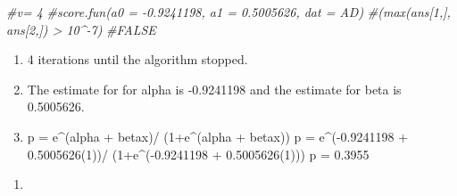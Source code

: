 \documentclass[
]{article}
\newenvironment{Shaded}{\begin{snugshade}}{\end{snugshade}}
\newcommand{\CommentTok}[1]{\textcolor[rgb]{0.56,0.35,0.01}{\textit{#1}}}
\providecommand{\tightlist}{%
  \setlength{\itemsep}{0pt}\setlength{\parskip}{0pt}}
\begin{document}
\begin{Shaded}
\begin{Highlighting}[]
\CommentTok{\#v= 4}
\CommentTok{\#score.fun(a0 = {-}0.9241198, a1 = 0.5005626, dat = AD)}
\CommentTok{\#(max(ans[1,], ans[2,]) \textgreater{} 10\^{}{-}7)}
\CommentTok{\#FALSE}
\end{Highlighting}
\end{Shaded}

\begin{enumerate}
\def\labelenumi{(\roman{enumi})}
\setcounter{enumi}{1}
\item
  4 iterations until the algorithm stopped.
\item
  The estimate for for alpha is -0.9241198 and the estimate for beta is
  0.5005626.
\item
  p = e\^{}(alpha + betax)/ (1+e\^{}(alpha + betax)) p =
  e\^{}(-0.9241198 + 0.5005626(1))/ (1+e\^{}(-0.9241198 + 0.5005626(1)))
  p = 0.3955
\end{enumerate}

\begin{enumerate}
\def\labelenumi{\alph{enumi})}
\setcounter{enumi}{3}
\tightlist
\item
\end{enumerate}
\end{document}
